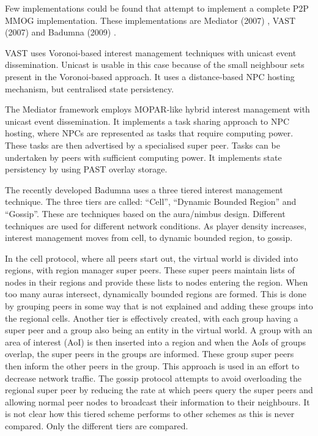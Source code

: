 \documentclass[journal,oneside,a4paper,onecolumn]{IEEEtran}
\begin{document}
Few implementations could be found that attempt to implement a complete P2P MMOG implementation. These implementations are Mediator (2007) \cite{Fan_phd}, VAST (2007) \cite{VON_VAST} and Badumna (2009) \cite{badumna_engine}.

VAST uses Voronoi-based interest management techniques with unicast event dissemination. Unicast is usable in this case because of the small neighbour sets present in the Voronoi-based approach. It uses a distance-based NPC hosting mechanism, but centralised state persistency.

The Mediator framework employs MOPAR-like hybrid interest management with unicast event dissemination. It implements a task sharing approach to NPC hosting, where NPCs are represented as tasks that require computing power. These tasks are then advertised by a specialised super peer. Tasks can be undertaken by peers with sufficient computing power. It implements state persistency by using PAST overlay storage.

The recently developed Badumna uses a three tiered interest management technique. The three tiers are called: ``Cell'', ``Dynamic Bounded Region'' and ``Gossip''. These are techniques based on the aura/nimbus design. Different techniques are used for different network conditions. As player density increases, interest management moves from cell, to dynamic bounded region, to gossip.

In the cell protocol, where all peers start out, the virtual world is divided into regions, with region manager super peers. These super peers maintain lists of nodes in their regions and provide these lists to nodes entering the region. When too many auras intersect, dynamically bounded regions are formed. This is done by grouping peers in some way that is not explained and adding these groups into the regional cells. Another tier is effectively created, with each group having a super peer and a group also being an entity in the virtual world. A group with an area of interest (AoI) is then inserted into a region and when the AoIs of groups overlap, the super peers in the groups are informed. These group super peers then inform the other peers in the group. This approach is used in an effort to decrease network traffic. The gossip protocol attempts to avoid overloading the regional super peer by reducing the rate at which peers query the super peers and allowing normal peer nodes to broadcast their information to their neighbours. It is not clear how this tiered scheme performs to other schemes as this is never compared. Only the different tiers are compared.
\end{document}
